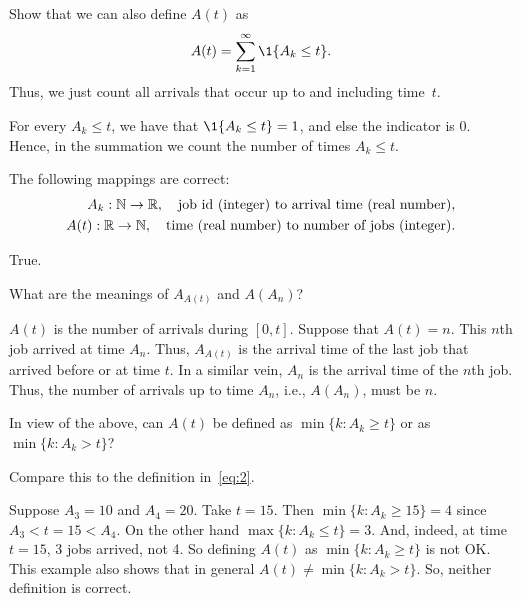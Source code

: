 \begin{exercise}
Show that we can also define $A(t)$ as
\begin{equation}
 A(t) = \sum_{k=1}^\infty \1{A_k \leq t}.
\end{equation}
Thus, we just count all arrivals that occur up to and including time~$t$.
\begin{hint}
  What is $\1{A_k \leq t\}$ if $A_k \leq t$? 
\end{hint}
\begin{solution}
For every $A_k \leq t$, we have that $\1{A_k \leq t} = 1$, and else the indicator is $0$. Hence, in the summation we count the number of times $A_k \leq t$. 
\end{solution}
\end{exercise}

\begin{extra}\mc
The following mappings are correct:
\begin{align*}
 A_k : \mathbb{N} \to \mathbb{R}, \quad{\text{job id (integer) to arrival time (real number)}}, \\
 A(t) : \mathbb{R}\to \mathbb{N}, \quad{\text{time (real number) to number of jobs (integer)}}.
\end{align*}
\begin{solution}
 True. 
\end{solution}
\end{extra}

\begin{extra}
 What are the meanings of $A_{A(t)}$ and $A(A_n)$?
\begin{solution}
 $A(t)$ is the number of arrivals during $[0,t]$. Suppose that
 $A(t) = n$. This $n$th job arrived at time $A_n$. Thus, $A_{A(t)}$
 is the arrival time of the last job that arrived before or at time
 $t$. In a similar vein, $A_n$ is the arrival time of the $n$th
 job. Thus, the number of arrivals up to time $A_n$, i.e., $A(A_n)$,
 must be $n$.
\end{solution}
\end{extra}

\begin{extra}
 In view of the above, can $A(t)$ be defined as $\min\{k : A_k \geq t\}$ or as $\min\{k: A_k > t\}$?
\begin{hint}
Compare this to the definition in~\cref{eq:2}.
\end{hint}
\begin{solution}
 Suppose $A_3 = 10$ and $A_4 = 20$. Take $t=15$. Then
 $\min\{k : A_k \geq 15\} = 4$ since $A_3 < t=15 < A_4$. On the
 other hand $\max\{k : A_k \leq t\} = 3$. And, indeed, at time $t=15$, 3 jobs arrived, not 4. So defining $A(t)$ as $\min\{k : A_k \geq t\}$ is not OK. This example also shows that in general $A(t) \neq \min\{k : A_k > t\}$. So, neither definition is correct. 

\end{solution}
\end{extra}

